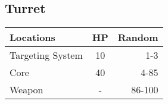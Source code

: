 \subsection{Turret}
\begin{minipage}{\columnwidth}
	\begin{tabularx}{\columnwidth}{|X|c|r|}
		\hline
		Locations        & HP & Random \\ \hline
		Targeting System & 10 &    1-3 \\ \hline
		Core             & 40 &   4-85 \\ \hline
		Weapon           & -  & 86-100 \\ \hline
	\end{tabularx}
\end{minipage}
